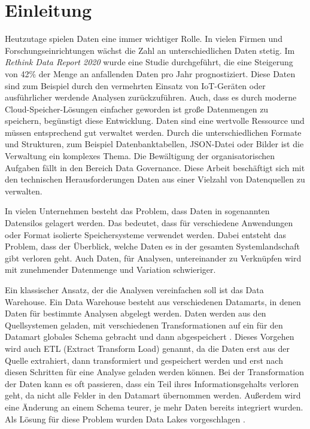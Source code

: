 \chapter{Einleitung}

Heutzutage spielen Daten eine immer wichtiger Rolle.
In vielen Firmen und Forschungseinrichtungen wächst die Zahl an unterschiedlichen Daten stetig.
Im \textit{Rethink Data Report 2020} \textcite{rethink_data_2020} wurde eine Studie durchgeführt, die eine Steigerung von 42\% der Menge an anfallenden Daten pro Jahr prognostiziert.
Diese Daten sind zum Beispiel durch den vermehrten Einsatz von IoT-Geräten oder ausführlicher werdende Analysen zurückzuführen.
Auch, dass es durch moderne Cloud-Speicher-Lösungen einfacher geworden ist große Datenmengen zu speichern, begünstigt diese Entwicklung.
Daten sind eine wertvolle Ressource und müssen entsprechend gut verwaltet werden.
Durch die unterschiedlichen Formate und Strukturen, zum Beispiel Datenbanktabellen, JSON-Datei oder Bilder ist die Verwaltung ein komplexes Thema.
Die Bewältigung der organisatorischen Aufgaben fällt in den Bereich Data Governance.
Diese Arbeit beschäftigt sich mit den technischen Herausforderungen Daten aus einer Vielzahl von Datenquellen zu verwalten.

In vielen Unternehmen besteht das Problem, dass Daten in sogenannten Datensilos gelagert werden.
Das bedeutet, dass für verschiedene Anwendungen oder Format isolierte Speichersysteme verwendet werden.
Dabei entsteht das Problem, dass der Überblick, welche Daten es in der gesamten Systemlandschaft gibt verloren geht.
Auch Daten, für Analysen, untereinander zu Verknüpfen wird mit zunehmender Datenmenge und Variation schwieriger.

Ein klassischer Ansatz, der die Analysen vereinfachen soll ist das Data Warehouse.
Ein Data Warehouse besteht aus verschiedenen Datamarts, in denen Daten für bestimmte Analysen abgelegt werden.
Daten werden aus den Quellsystemen geladen, mit verschiedenen Transformationen auf ein für den Datamart globales Schema gebracht und dann abgespeichert \parencite{dw}.
Dieses Vorgehen wird auch ETL (Extract Transform Load) genannt, da die Daten erst aus der Quelle extrahiert, dann transformiert und gespeichert werden und erst nach diesen Schritten für eine Analyse geladen werden können.
Bei der Transformation der Daten kann es oft passieren, dass ein Teil ihres Informationsgehalts verloren geht, da nicht alle Felder in den Datamart übernommen werden.
Außerdem wird eine Änderung an einem Schema teurer, je mehr Daten bereits integriert wurden.
Als Lösung für diese Problem wurden Data Lakes vorgeschlagen \parencite{dixon2010pentaho,datalake_03}.

